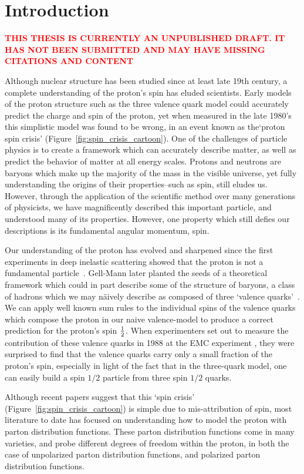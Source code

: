 \chapter{Introduction}

\textbf{\textcolor{red}{THIS THESIS IS CURRENTLY AN UNPUBLISHED DRAFT. IT HAS
NOT BEEN SUBMITTED AND MAY HAVE MISSING CITATIONS AND CONTENT}}

Although nuclear structure has been studied since at least late 19th century, a
complete understanding of the proton's spin has eluded scientists.  Early models
of the proton structure such as the three valence quark model could accurately
predict the charge and spin of the proton, yet when measured in the late 1980's
this simplistic model was found to be wrong, in an event known as the`proton
spin crisis' (Figure~\ref{fig:spin_crisis_cartoon}). One of the challenges of
particle physics is to create a framework which can accurately describe matter,
as well as predict the behavior of matter at all energy scales. Protons and
neutrons are baryons which make up the majority of the mass in the visible
universe, yet fully understanding the origins of their properties--such as spin,
still eludes us. However, through the application of the scientific method over
many generations of physicists, we have magnificently described this important
particle, and understood many of its properties.  However, one property which
still defies our descriptions is its fundamental angular momentum, spin.
	
Our understanding of the proton has evolved and sharpened since the first
experiments in deep inelastic scattering showed that the proton is not a
fundamental particle~\cite{Breidenbach1969}. Gell-Mann later planted the seeds
of a theoretical framework which could in part describe some of the structure of
baryons, a class of hadrons which we may n{\"a}ively describe as composed of three
`valence quarks'~\cite{Bjorken1969}. We can apply well known sum rules to the
individual spins of the valence quarks which compose the proton in our naive
valence-model to produce a correct prediction for the proton's spin
${1}\over{2}$. When experimenters set out to measure the contribution of these
valence quarks in 1988 at the EMC experiment \cite{Ashman1988}, they were
surprised to find that the valence quarks carry only a small fraction of the
proton's spin, especially in light of the fact that in the three-quark model,
one can easily build a spin $1/2$ particle from three spin $1/2$ quarks. 

Although recent papers \cite{Povh2016} suggest that this `spin crisis'
(Figure~\ref{fig:spin_crisis_cartoon}) is simple due to mis-attribution of spin,
most literature to date has focused on understanding how to model the proton
with parton distribution functions. These parton distribution functions come in
many varieties, and probe different degrees of freedom within the proton, in
both the case of unpolarized parton distribution functions, and polarized parton
distribution functions. 

